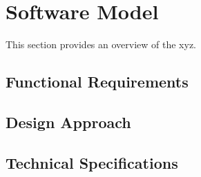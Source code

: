 \section{Software Model} %
This section provides an overview of the xyz.


\subsection{Functional Requirements}

\subsection{Design Approach}

\subsection{Technical Specifications}

